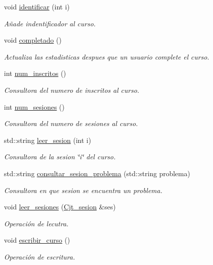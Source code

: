 \begin{DoxyCompactItemize}
void \mbox{\hyperlink{class_curso_a88963d0571e8633bf77f7508e02a031b}{identificar}} (int i)
\begin{DoxyCompactList}\small\item\em Añade indentificador al curso. \end{DoxyCompactList}\item 
void \mbox{\hyperlink{class_curso_a832e6ccf726c8534162079e9a041aac9}{completado}} ()
\begin{DoxyCompactList}\small\item\em Actualiza las estadisticas despues que un usuario complete el curso. \end{DoxyCompactList}\item 
int \mbox{\hyperlink{class_curso_aca56beb776cf49d4c330e446032cd572}{num\+\_\+inscritos}} ()
\begin{DoxyCompactList}\small\item\em Consultora del numero de inscritos al curso. \end{DoxyCompactList}\item 
int \mbox{\hyperlink{class_curso_a39e86aa0e422cbabb906fcb4878a1a86}{num\+\_\+sesiones}} ()
\begin{DoxyCompactList}\small\item\em Consultora del numero de sesiones al curso. \end{DoxyCompactList}\item 
std\+::string \mbox{\hyperlink{class_curso_a85eb71e4b4a6013526f8afbb1466c2e2}{leer\+\_\+sesion}} (int i)
\begin{DoxyCompactList}\small\item\em Consultora de la sesion \char`\"{}i\char`\"{} del curso. \end{DoxyCompactList}\item 
std\+::string \mbox{\hyperlink{class_curso_a84e25406614d5e938909385cf860d3f8}{consultar\+\_\+sesion\+\_\+problema}} (std\+::string problema)
\begin{DoxyCompactList}\small\item\em Consultora en que sesion se encuentra un problema. \end{DoxyCompactList}\item 
void \mbox{\hyperlink{class_curso_ad60de4c73f3ce9195c0f681f508f83c8}{leer\+\_\+sesiones}} (\mbox{\hyperlink{class_cjt__sesion}{Cjt\+\_\+sesion}} \&ses)
\begin{DoxyCompactList}\small\item\em Operación de lecutra. \end{DoxyCompactList}\item 
void \mbox{\hyperlink{class_curso_ac196f3a5a5d30d41d2c0a0c295f052d3}{escribir\+\_\+curso}} ()
\begin{DoxyCompactList}\small\item\em Operación de escritura. \end{DoxyCompactList}\end{DoxyCompactItemize}
